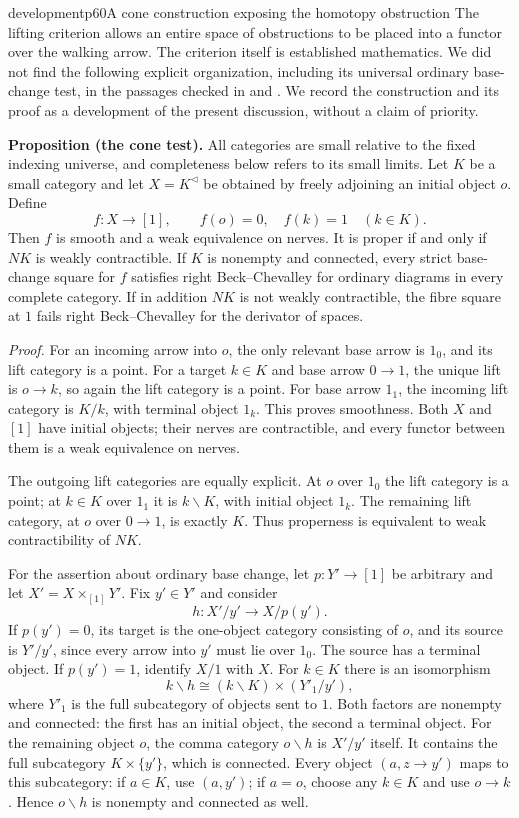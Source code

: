 \begin{dcomment}{development}{p60}{A cone construction exposing the homotopy obstruction}
The lifting criterion allows an entire space of obstructions to be placed into a functor over the walking arrow. The criterion itself is established mathematics. We did not find the following explicit organization, including its universal ordinary base-change test, in the passages checked in \citet[\S1 and \S4]{Maltsiniotis2005Asphericite} and \citet[\S3]{GrothPontoShulman2014}. We record the construction and its proof as a development of the present discussion, without a claim of priority.

\textbf{Proposition (the cone test).}\ours
All categories are small relative to the fixed indexing universe, and completeness below refers to its small limits. Let $K$ be a small category and let $X=K^{\triangleleft}$ be obtained by freely adjoining an initial object $o$. Define
\[
 f:X\longrightarrow[1],\qquad f(o)=0,\quad f(k)=1\quad(k\in K).
\]
Then $f$ is smooth and a weak equivalence on nerves. It is proper if and only if $NK$ is weakly contractible. If $K$ is nonempty and connected, every strict base-change square for $f$ satisfies right Beck--Chevalley for ordinary diagrams in every complete category. If in addition $NK$ is not weakly contractible, the fibre square at $1$ fails right Beck--Chevalley for the derivator of spaces.

\emph{Proof.} For an incoming arrow into $o$, the only relevant base arrow is $1_0$, and its lift category is a point. For a target $k\in K$ and base arrow $0\to1$, the unique lift is $o\to k$, so again the lift category is a point. For base arrow $1_1$, the incoming lift category is $K/k$, with terminal object $1_k$. This proves smoothness. Both $X$ and $[1]$ have initial objects; their nerves are contractible, and every functor between them is a weak equivalence on nerves.

The outgoing lift categories are equally explicit. At $o$ over $1_0$ the lift category is a point; at $k\in K$ over $1_1$ it is $k\backslash K$, with initial object $1_k$. The remaining lift category, at $o$ over $0\to1$, is exactly $K$. Thus properness is equivalent to weak contractibility of $NK$.

For the assertion about ordinary base change, let $p:Y'\to[1]$ be arbitrary and let $X'=X\times_{[1]}Y'$. Fix $y'\in Y'$ and consider
\[
 h:X'/y'\longrightarrow X/p(y').
\]
If $p(y')=0$, its target is the one-object category consisting of $o$, and its source is $Y'/y'$, since every arrow into $y'$ must lie over $1_0$. The source has a terminal object. If $p(y')=1$, identify $X/1$ with $X$. For $k\in K$ there is an isomorphism
\[
 k\backslash h\cong(k\backslash K)\times(Y'_1/y'),
\]
where $Y'_1$ is the full subcategory of objects sent to $1$. Both factors are nonempty and connected: the first has an initial object, the second a terminal object. For the remaining object $o$, the comma category $o\backslash h$ is $X'/y'$ itself. It contains the full subcategory $K\times\{y'\}$, which is connected. Every object $(a,z\to y')$ maps to this subcategory: if $a\in K$, use $(a,y')$; if $a=o$, choose any $k\in K$ and use $o\to k$. Hence $o\backslash h$ is nonempty and connected as well.


\end{dcomment}
